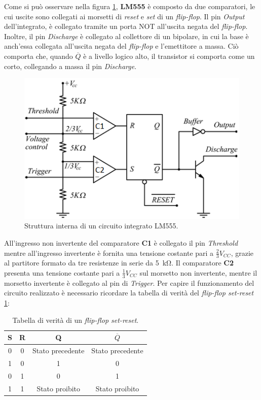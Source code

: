 \noindent
Come si può osservare nella figura \ref{fig:555_internals}, \textbf{LM555} è composto da due comparatori, le cui uscite sono collegati ai morsetti di \textit{reset} e \textit{set} di un \textit{flip-flop}. Il pin \textit{Output} dell'integrato, è collegato tramite un porta NOT all'uscita negata del \textit{flip-flop}. Inoltre, il pin \textit{Discharge} è collegato al collettore di un bipolare, in cui la base è anch'essa collegata all'uscita negata del \textit{flip-flop} e l'emettitore a massa. Ciò comporta che, quando \textbf{$\overline{Q}$} è a livello logico alto, il transistor si comporta come un corto, collegando a massa il pin \textit{Discharge}. 

\begin{figure}[h!]
	\centering
	\includegraphics[width=0.6\linewidth]{./ImageFiles/Laboratorio 4/555internals.jpg}
	\caption{Struttura interna di un circuito integrato LM555.}
	\label{fig:555_internals}
\end{figure}

\noindent
All'ingresso non invertente del comparatore \textbf{C1} è collegato il pin \textit{Threshold}  mentre all'ingresso invertente è fornita una tensione costante pari a $\frac{2}{3}V_{CC}$, grazie al partitore formato da tre resistenze in serie da \SI{5}{\kilo\ohm}. Il comparatore \textbf{C2} presenta una tensione costante pari a $\frac{1}{3}V_{CC}$ sul morsetto non invertente, mentre il morsetto invertente è collegato al pin di \textit{Trigger}.
Per capire il funzionamento del circuito realizzato è necessario ricordare la tabella di verità del \textit{flip-flop set-reset} \ref{tab:flip_flop_states}:

\def\arraystretch{1.3}
\begin{table}[h!]
	\centering
	\begin{tabular}{|c|c|c|c|}
		\hline
		S	& R & Q & $\overline{Q}$\\ \hline
		0 & 0 & Stato precedente & Stato precedente  \\ \hline
		1 & 0 & 1 & 0\\ \hline
		0 & 1 & 0 & 1\\ \hline
		1 & 1 & Stato proibito & Stato proibito \\ \hline
	\end{tabular}
	\caption{Tabella di verità di un \textit{flip-flop set-reset}.}
	\label{tab:flip_flop_states}
\end{table}

